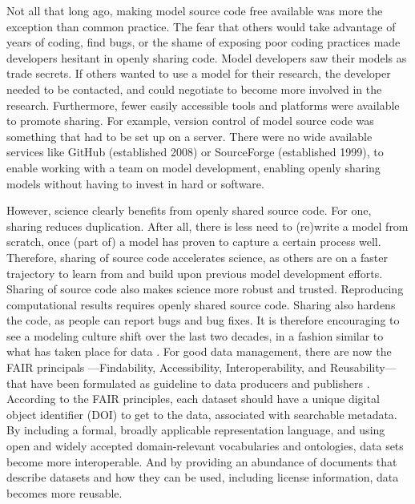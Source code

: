 \documentclass[12pt]{amsart}
\begin{document}
Not all that long ago, making model source code free available was more the exception than common practice. The fear that others would take advantage of years of coding, find bugs, or the shame of exposing poor coding practices made developers hesitant in openly sharing code. Model developers saw their models as trade secrets. If others wanted to use a model for their research, the developer needed to be contacted, and could negotiate to become more involved in the research. Furthermore, fewer easily accessible tools and platforms were available to promote sharing. For example, version control of model source code was something that had to be set up on a server. There were no wide available services like GitHub (established 2008) or SourceForge (established 1999), to enable working with a team on model development, enabling openly sharing models without having to invest in hard or software.

However, science clearly benefits from openly shared source code. For one, sharing reduces duplication. After all, there is less need to (re)write a model from scratch, once (part of) a model has proven to capture a certain process well. Therefore, sharing of source code accelerates science, as others are on a faster trajectory to learn from and build upon previous model development efforts. Sharing of source code also makes science more robust and trusted. Reproducing computational results requires openly shared source code. Sharing also hardens the code, as people can report bugs and bug fixes. It is therefore encouraging to see a modeling culture shift over the last two decades, in a fashion similar to what has taken place for data \citep[e.g.,][]{hsu2015data}. For good data management, there are now the FAIR principals ---Findability, Accessibility, Interoperability, and Reusability---that have been formulated as guideline to data producers and publishers \cite{wilkinson2016fair}. According to the FAIR principles, each dataset should have a unique digital object identifier (DOI) to get to the data, associated with searchable metadata. By including a formal, broadly applicable representation language, and using open and widely accepted domain-relevant vocabularies and ontologies, data sets become more interoperable. And by providing an abundance of documents that describe datasets and how they can be used, including license information, data becomes more reusable.
\end{document}
